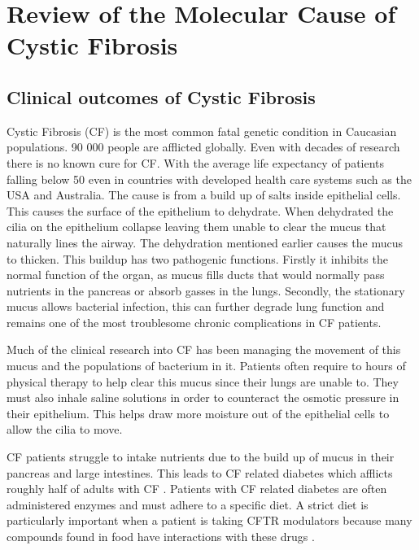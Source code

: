 \chapter{Review of the Molecular Cause of Cystic Fibrosis}
\label{chap:cftr_review}
\newpage
\section{Clinical outcomes of Cystic Fibrosis}
Cystic Fibrosis (CF) is the most common fatal genetic condition in Caucasian populations. 90 000 people are afflicted globally. Even with decades of research there is no known cure for CF. With the average life expectancy of patients falling below 50 even in countries with developed health care systems such as the USA and Australia\cite{}\cite{}. The cause is from a build up of salts inside epithelial cells. This causes the surface of the epithelium to dehydrate. When dehydrated the cilia on the epithelium collapse leaving them unable to clear the mucus that naturally lines the airway\cite{boucher2007}. The dehydration mentioned earlier causes the mucus to thicken. This buildup has two pathogenic functions. Firstly it inhibits the normal function of the organ, as mucus fills ducts that would normally pass nutrients in the pancreas or absorb gasses in the lungs. Secondly, the stationary mucus allows bacterial infection, this can further degrade lung function and remains one of the most troublesome chronic complications in CF patients. 

Much of the clinical research into CF has been managing the movement of this mucus and the populations of bacterium in it. Patients often require to hours of physical therapy to help clear this mucus since their lungs are unable to. They must also inhale saline solutions in order to counteract the osmotic pressure in their epithelium. This helps draw more moisture out of the epithelial cells to allow the cilia to move. 

CF patients struggle to intake nutrients due to the build up of mucus in their pancreas and large intestines. This leads to CF related diabetes which afflicts roughly half of adults with CF \cite{Kayani2018}. Patients with CF related diabetes are often administered enzymes and must adhere to a specific diet. A strict diet is particularly important when a patient is taking CFTR modulators because many compounds found in food have interactions with these drugs \cite{}.

